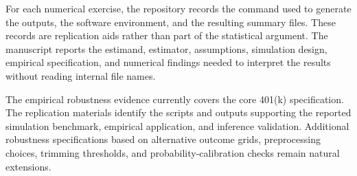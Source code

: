 \documentclass[final,3p,fleqn, 10pt]{elsarticle}
\begin{document}
For each numerical exercise, the repository records the command used to generate the outputs, the software environment, and the resulting summary files. These records are replication aids rather than part of the statistical argument. The manuscript reports the estimand, estimator, assumptions, simulation design, empirical specification, and numerical findings needed to interpret the results without reading internal file names.

The empirical robustness evidence currently covers the core 401(k) specification. The replication materials identify the scripts and outputs supporting the reported simulation benchmark, empirical application, and inference validation. Additional robustness specifications based on alternative outcome grids, preprocessing choices, trimming thresholds, and probability-calibration checks remain natural extensions.
\end{document}
